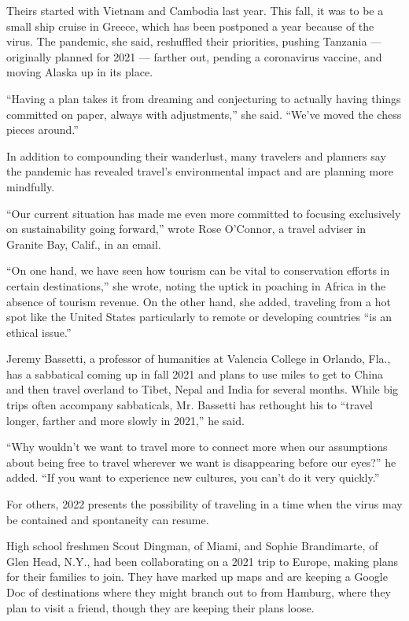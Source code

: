 Theirs started with Vietnam and Cambodia last year. This fall, it was to
be a small ship cruise in Greece, which has been postponed a year
because of the virus. The pandemic, she said, reshuffled their
priorities, pushing Tanzania --- originally planned for 2021 --- farther
out, pending a coronavirus vaccine, and moving Alaska up in its place.

``Having a plan takes it from dreaming and conjecturing to actually
having things committed on paper, always with adjustments,'' she said.
``We've moved the chess pieces around.''

In addition to compounding their wanderlust, many travelers and planners
say the pandemic has revealed travel's environmental impact and are
planning more mindfully.

``Our current situation has made me even more committed to focusing
exclusively on sustainability going forward,'' wrote Rose O'Connor, a
travel adviser in Granite Bay, Calif., in an email.

``On one hand, we have seen how tourism can be vital to conservation
efforts in certain destinations,'' she wrote, noting the uptick in
poaching in Africa in the absence of tourism revenue. On the other hand,
she added, traveling from a hot spot like the United States particularly
to remote or developing countries ``is an ethical issue.''

Jeremy Bassetti, a professor of humanities at Valencia College in
Orlando, Fla., has a sabbatical coming up in fall 2021 and plans to use
miles to get to China and then travel overland to Tibet, Nepal and India
for several months. While big trips often accompany sabbaticals, Mr.
Bassetti has rethought his to ``travel longer, farther and more slowly
in 2021,'' he said.

``Why wouldn't we want to travel more to connect more when our
assumptions about being free to travel wherever we want is disappearing
before our eyes?'' he added. ``If you want to experience new cultures,
you can't do it very quickly.''

For others, 2022 presents the possibility of traveling in a time when
the virus may be contained and spontaneity can resume.

High school freshmen Scout Dingman, of Miami, and Sophie Brandimarte, of
Glen Head, N.Y., had been collaborating on a 2021 trip to Europe, making
plans for their families to join. They have marked up maps and are
keeping a Google Doc of destinations where they might branch out to from
Hamburg, where they plan to visit a friend, though they are keeping
their plans loose.

